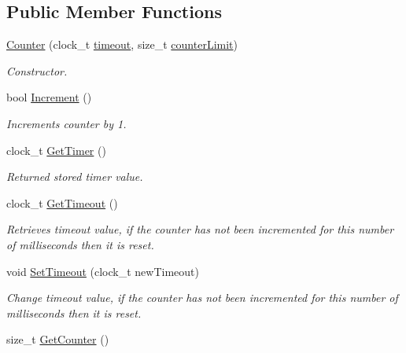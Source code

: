 \subsection*{Public Member Functions}
\begin{DoxyCompactItemize}
\item 
\hyperlink{class_counter_ad884049fe4db7764357c3df4b1e9aca2}{Counter} (clock\_\-t \hyperlink{class_counter_aaf8311a4c0e6608e29b4b73815ca4e59}{timeout}, size\_\-t \hyperlink{class_counter_a3fcc72a60f11ec2d1cdbfee9c9972a69}{counterLimit})
\begin{DoxyCompactList}\small\item\em Constructor. \item\end{DoxyCompactList}\item 
bool \hyperlink{class_counter_a5216d6aa34d76561bd3512dee61f6a14}{Increment} ()
\begin{DoxyCompactList}\small\item\em Increments counter by 1. \item\end{DoxyCompactList}\item 
clock\_\-t \hyperlink{class_counter_aa3c4b09402cb480da357f587d3f73193}{GetTimer} ()
\begin{DoxyCompactList}\small\item\em Returned stored timer value. \item\end{DoxyCompactList}\item 
clock\_\-t \hyperlink{class_counter_a61f92d52a8adf8e5a99daed34ee114de}{GetTimeout} ()
\begin{DoxyCompactList}\small\item\em Retrieves timeout value, if the counter has not been incremented for this number of milliseconds then it is reset. \item\end{DoxyCompactList}\item 
void \hyperlink{class_counter_ac7013b92446259e2cb1beaa259669265}{SetTimeout} (clock\_\-t newTimeout)
\begin{DoxyCompactList}\small\item\em Change timeout value, if the counter has not been incremented for this number of milliseconds then it is reset. \item\end{DoxyCompactList}\item 
size\_\-t \hyperlink{class_counter_ad303afe4ec257af4c65d15a595246591}{GetCounter} ()

\end{DoxyCompactItemize}
